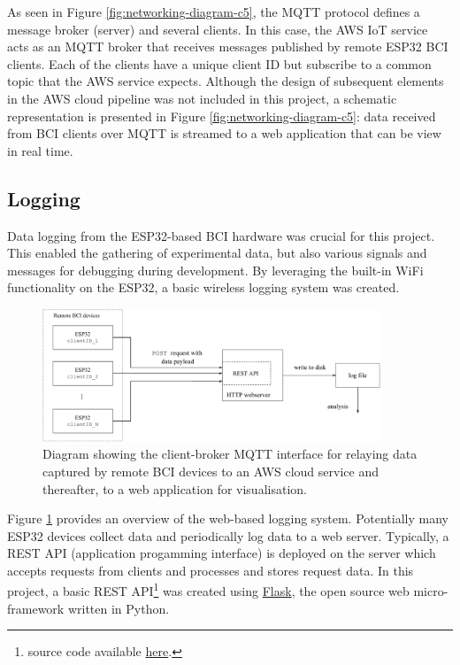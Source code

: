 As seen in Figure \ref{fig:networking-diagram-c5}, the MQTT protocol defines a message broker (server) and several clients. In this case, the AWS IoT service acts as an MQTT broker that receives messages published by remote ESP32 BCI clients. Each of the clients have a unique client ID but subscribe to a common topic that the AWS service expects. Although the design of subsequent elements in the AWS cloud pipeline was not included in this project, a schematic representation is presented in Figure \ref{fig:networking-diagram-c5}: data received from BCI clients over MQTT is streamed to a web application that can be view in real time.

\subsection{Logging}
Data logging from the ESP32-based BCI hardware was crucial for this project. This enabled the gathering of experimental data, but also various signals and messages for debugging during development. By leveraging the built-in WiFi functionality on the ESP32, a basic wireless logging system was created. 

\begin{figure}[!htb]
    \centering
    \includegraphics[width=0.9\textwidth]{web-logger-diagram}
    \caption{Diagram showing the client-broker MQTT interface for relaying data captured by remote BCI devices to an AWS cloud service and thereafter, to a web application for visualisation. }
    \label{fig:web-logger-c5}
\end{figure}

Figure \ref{fig:web-logger-c5} provides an overview of the web-based logging system. Potentially many ESP32 devices collect data and periodically log data to a web server. Typically, a REST API (application progamming interface) is deployed on the server which accepts requests from clients and processes and stores request data. In this project, a basic REST API\footnote{source code available \href{https://github.com/JamesTev/EEG-decoding/blob/master/eeg_lib/logging_server.py}{here}.} was created using \href{https://flask.palletsprojects.com/en/2.0.x/}{Flask}, the open source web micro-framework written in Python. 

